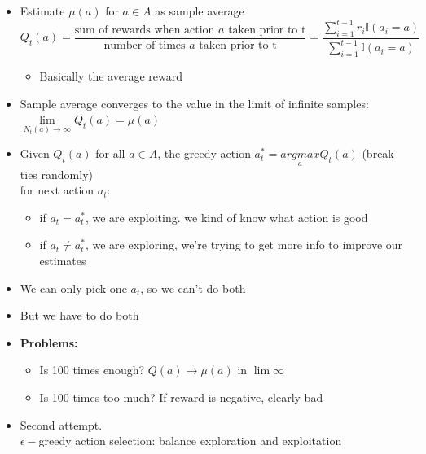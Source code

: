 \documentclass[10pt, oneside]{article}
\begin{document}
\begin{itemize}
\begin{itemize}
\begin{itemize}
            \item Estimate $\mu(a)$ for $a\in A$ as sample average
            \[Q_t(a) = \frac{\text{sum of rewards when action $a$ taken prior to t}}{\text{number of times $a$ taken prior to t}} = \frac{\sum_{i=1}^{t-1} r_i \mathbb{I}(a_i = a)}{\sum_{i=1}^{t-1} \mathbb{I}(a_i = a)}\]
            \begin{itemize}
                \item Basically the average reward
            \end{itemize}
            \item Sample average converges to the value in the limit of infinite samples: $\underset{N_t (a )\rightarrow \infty}{\lim} Q_t (a) = \mu(a)$
            \item Given $Q_t(a)$ for all $a\in A$, the greedy action $a_t^* = \underset{a}{argmax} Q_t(a)$ (break ties randomly) \\for next action $a_t$:
            \begin{itemize}
                \item if $a_t = a_t^*$, we are exploiting. we kind of know what action is good
                \item if $a_t \neq a_t^*$, we are exploring, we're trying to get more info to improve our estimates
            \end{itemize}
            \item We can only pick one $a_t$, so we can't do both
            \item But we have to do both
            \item \textbf{Problems:}
            \begin{itemize}
                \item Is 100 times enough? $Q(a) \rightarrow \mu(a)$ in $\lim \infty$
                \item Is 100 times too much? If reward is negative, clearly bad
            \end{itemize}
            \item Second attempt.\\$\epsilon-$greedy action selection: balance exploration and exploitation
        \end{itemize}
    \end{itemize}
\end{itemize}
\end{document}
